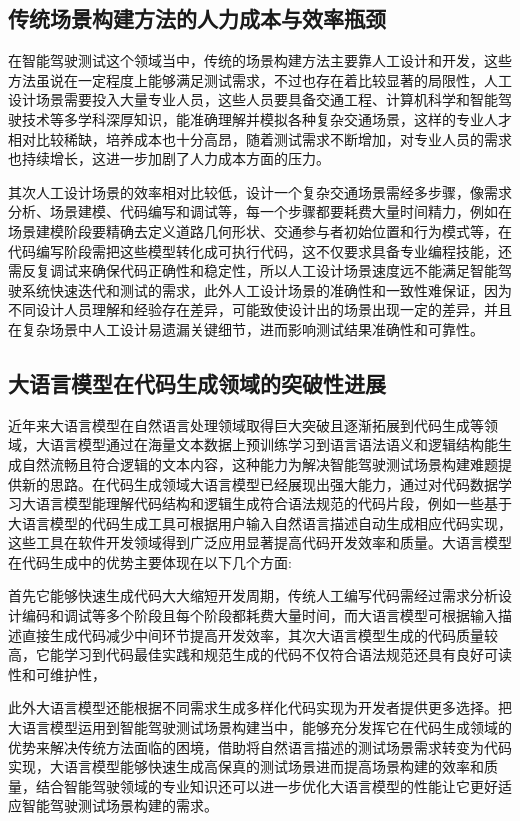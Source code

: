 \subsection{传统场景构建方法的人力成本与效率瓶颈}
在智能驾驶测试这个领域当中，传统的场景构建方法主要靠人工设计和开发\cite{cui2023chatlaw}，这些方法虽说在一定程度上能够满足测试需求，不过也存在着比较显著的局限性，人工设计场景需要投入大量专业人员，这些人员要具备交通工程、计算机科学和智能驾驶技术等多学科深厚知识，能准确理解并模拟各种复杂交通场景，这样的专业人才相对比较稀缺，培养成本也十分高昂，随着测试需求不断增加，对专业人员的需求也持续增长，这进一步加剧了人力成本方面的压力。

其次人工设计场景的效率相对比较低，设计一个复杂交通场景需经多步骤，像需求分析、场景建模、代码编写和调试等，每一个步骤都要耗费大量时间精力，例如在场景建模阶段要精确去定义道路几何形状、交通参与者初始位置和行为模式等，在代码编写阶段需把这些模型转化成可执行代码，这不仅要求具备专业编程技能，还需反复调试来确保代码正确性和稳定性，所以人工设计场景速度远不能满足智能驾驶系统快速迭代和测试的需求，此外人工设计场景的准确性和一致性难保证，因为不同设计人员理解和经验存在差异，可能致使设计出的场景出现一定的差异，并且在复杂场景中人工设计易遗漏关键细节，进而影响测试结果准确性和可靠性。

\subsection{大语言模型在代码生成领域的突破性进展}
近年来大语言模型在自然语言处理领域取得巨大突破且逐渐拓展到代码生成等领域，大语言模型通过在海量文本数据上预训练学习到语言语法语义和逻辑结构能生成自然流畅且符合逻辑的文本内容，这种能力为解决智能驾驶测试场景构建难题提供新的思路。在代码生成领域大语言模型已经展现出强大能力\cite{chowdhery2022palm}，通过对代码数据学习大语言模型能理解代码结构和逻辑生成符合语法规范的代码片段，例如一些基于大语言模型的代码生成工具可根据用户输入自然语言描述自动生成相应代码实现，这些工具在软件开发领域得到广泛应用显著提高代码开发效率和质量。大语言模型在代码生成中的优势主要体现在以下几个方面:

首先它能够快速生成代码大大缩短开发周期，传统人工编写代码需经过需求分析设计编码和调试等多个阶段且每个阶段都耗费大量时间，而大语言模型可根据输入描述直接生成代码减少中间环节提高开发效率\cite{feng2021intelligent}，其次大语言模型生成的代码质量较高，它能学习到代码最佳实践和规范生成的代码不仅符合语法规范还具有良好可读性和可维护性，

此外大语言模型还能根据不同需求生成多样化代码实现为开发者提供更多选择。把大语言模型运用到智能驾驶测试场景构建当中\cite{kong2020physgan}，能够充分发挥它在代码生成领域的优势来解决传统方法面临的困境，借助将自然语言描述的测试场景需求转变为代码实现，大语言模型能够快速生成高保真的测试场景进而提高场景构建的效率和质量，结合智能驾驶领域的专业知识还可以进一步优化大语言模型的性能让它更好适应智能驾驶测试场景构建的需求。



